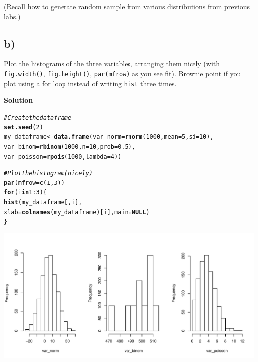 \documentclass{article}\usepackage[]{graphicx}\usepackage[]{color}
\makeatletter
\def\maxwidth{ %
  \ifdim\Gin@nat@width>\linewidth
    \linewidth
  \else
    \Gin@nat@width
  \fi
}
\newcommand{\hlnum}[1]{\textcolor[rgb]{0.686,0.059,0.569}{#1}}%
\newcommand{\hlcom}[1]{\textcolor[rgb]{0.678,0.584,0.686}{\textit{#1}}}%
\newcommand{\hlopt}[1]{\textcolor[rgb]{0,0,0}{#1}}%
\newcommand{\hlstd}[1]{\textcolor[rgb]{0.345,0.345,0.345}{#1}}%
\newcommand{\hlkwa}[1]{\textcolor[rgb]{0.161,0.373,0.58}{\textbf{#1}}}%
\newcommand{\hlkwb}[1]{\textcolor[rgb]{0.69,0.353,0.396}{#1}}%
\newcommand{\hlkwc}[1]{\textcolor[rgb]{0.333,0.667,0.333}{#1}}%
\newcommand{\hlkwd}[1]{\textcolor[rgb]{0.737,0.353,0.396}{\textbf{#1}}}%
\newenvironment{kframe}{%
 \def\at@end@of@kframe{}%
 \ifinner\ifhmode%
  \def\at@end@of@kframe{\end{minipage}}%
  \begin{minipage}{\columnwidth}%
 \fi\fi%
 \def\FrameCommand##1{\hskip\@totalleftmargin \hskip-\fboxsep
 \colorbox{shadecolor}{##1}\hskip-\fboxsep
     \hskip-\linewidth \hskip-\@totalleftmargin \hskip\columnwidth}%
 \MakeFramed {\advance\hsize-\width
   \@totalleftmargin\z@ \linewidth\hsize
   \@setminipage}}%
 {\par\unskip\endMakeFramed%
 \at@end@of@kframe}
\newenvironment{knitrout}{}{} %
\makeatother
\begin{document}
(Recall how to generate random sample from various distributions from previous labs.)

\subsection*{b)}

Plot the histograms of the three variables, arranging them nicely (with \verb`fig.width()`, \verb`fig.height()`, \verb`par(mfrow)` as you see fit). Brownie point if you plot using a for loop instead of writing \verb`hist` three times.

\textbf{Solution}

\begin{knitrout}
\color{fgcolor}\begin{kframe}
\begin{alltt}
\hlcom{# Create the data frame}
\hlkwd{set.seed}\hlstd{(}\hlnum{2}\hlstd{)}
\hlstd{my_dataframe} \hlkwb{<-} \hlkwd{data.frame}\hlstd{(}\hlkwc{var_norm} \hlstd{=} \hlkwd{rnorm}\hlstd{(}\hlnum{1000}\hlstd{,} \hlkwc{mean} \hlstd{=} \hlnum{5}\hlstd{,} \hlkwc{sd} \hlstd{=} \hlnum{10}\hlstd{),}
                           \hlkwc{var_binom} \hlstd{=} \hlkwd{rbinom}\hlstd{(}\hlnum{1000}\hlstd{,} \hlkwc{n} \hlstd{=} \hlnum{10}\hlstd{,} \hlkwc{prob} \hlstd{=} \hlnum{0.5}\hlstd{),}
                           \hlkwc{var_poisson} \hlstd{=} \hlkwd{rpois}\hlstd{(}\hlnum{1000}\hlstd{,} \hlkwc{lambda} \hlstd{=} \hlnum{4}\hlstd{))}
\end{alltt}
\end{kframe}
\end{knitrout}

\begin{knitrout}
\color{fgcolor}\begin{kframe}
\begin{alltt}
\hlcom{# Plot the histogram (nicely)}
\hlkwd{par}\hlstd{(}\hlkwc{mfrow} \hlstd{=} \hlkwd{c}\hlstd{(}\hlnum{1}\hlstd{,} \hlnum{3}\hlstd{))}
\hlkwa{for} \hlstd{(i} \hlkwa{in} \hlnum{1}\hlopt{:}\hlnum{3}\hlstd{) \{}
  \hlkwd{hist}\hlstd{(my_dataframe[ , i],}
       \hlkwc{xlab} \hlstd{=} \hlkwd{colnames}\hlstd{(my_dataframe)[i],} \hlkwc{main} \hlstd{=} \hlkwa{NULL}\hlstd{)}
\hlstd{\}}
\end{alltt}
\end{kframe}
\includegraphics[width=\maxwidth]{figure/unnamed-chunk-2-1} 

\end{knitrout}
\end{document}
